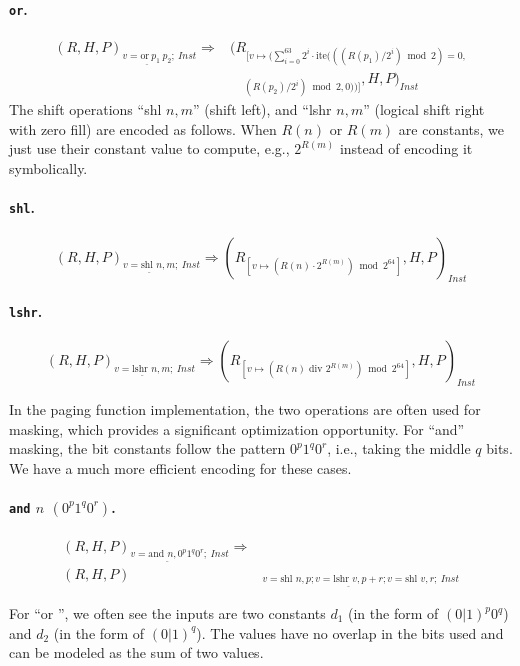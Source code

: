 \paragraph{\texttt{or}.}
\[
\begin{aligned}
(R,H,P)_{\underline{v = \text{or}\ p_1\ p_2};\ \mathit{Inst}} \Rightarrow &
(R_{[v\mapsto ( \sum_{i=0}^{63} 2^i \cdot \text{ite}(((R(p_1)/2^i)\bmod2)=0,}\\
&\quad_{(R(p_2)/2^i)\bmod2, 0))]},H,P)_\mathit{Inst}
\end{aligned}
\]
The shift operations ``shl $n,m$'' (shift left), and ``lshr $n,m$'' (logical shift right with zero fill) are encoded as follows. When $R(n)$ or $R(m)$ are constants, we just use their constant value to compute, e.g., $2^{R(m)}$ instead of encoding it symbolically.

\paragraph{\texttt{shl}.}
\[
(R,H,P)_{\underline{v = \text{shl } n,m};\ \mathit{Inst}} \Rightarrow 
(R_{[v\mapsto (R(n)\cdot 2^{R(m)}) \bmod 2^{64}]},H,P)_\mathit{Inst}
\]

\paragraph{\texttt{lshr}.}
\[
(R,H,P)_{\underline{v = \text{lshr } n,m};\ \mathit{Inst}} \Rightarrow 
(R_{[v\mapsto (R(n)\text{ div } 2^{R(m)}) \bmod 2^{64}]},H,P)_\mathit{Inst}
\]

In the paging function implementation, the two operations are often used for masking, which provides a significant optimization opportunity. For ``and'' masking, the bit constants follow the pattern $0^p 1^q 0^r$, i.e., taking the middle $q$ bits. We have a much more efficient encoding for these cases.

\paragraph{\texttt{and} $n$  $(0^p 1^q 0^r)$.}

\[
\begin{aligned}
(R,H,P)_{\underline{v = \text{and } n, 0^p 1^q 0^r};\ \mathit{Inst}} \Rightarrow & \\
 (R,H,P)&_{\underline{v = \text{shl } n,p; v = \text{lshr } v,p+r; v = \text{shl } v,r};\ \mathit{Inst}} 
\end{aligned}
\]

For ``or '', we often see the inputs are two constants $d_1$ (in the form of $(0|1)^p0^q$) and $d_2$ (in the form of $(0|1)^q$). The values have no overlap in the bits used and can be modeled as the sum of two values.

